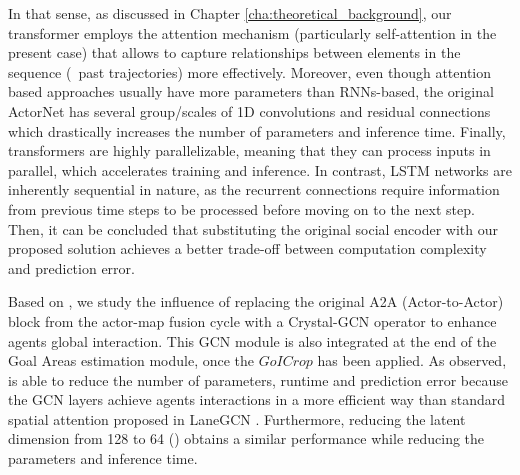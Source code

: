In that sense, as discussed in Chapter \ref{cha:theoretical_background}, our transformer employs the attention mechanism (particularly self-attention in the present case) that allows to capture relationships between elements in the sequence (\ie \ past trajectories) more effectively. Moreover, even though attention based approaches usually have more parameters than \acp{RNN}-based, the original ActorNet has several group/scales of 1D convolutions and residual connections which drastically increases the number of parameters and inference time. Finally, transformers are highly parallelizable, meaning that they can process inputs in parallel, which accelerates training and inference. In contrast, \ac{LSTM} networks are inherently sequential in nature, as the recurrent connections require information from previous time steps to be processed before moving on to the next step. Then, it can be concluded that substituting the original social encoder with our proposed solution achieves a better trade-off between computation complexity and prediction error. 

Based on , we study the influence of replacing the original A2A (Actor-to-Actor) block from the actor-map fusion cycle \cite{liang2020learning} with a Crystal-\ac{GCN} \cite{schmidt2022crat} operator to enhance agents global interaction. This \ac{GCN} module is also integrated at the end of the Goal Areas estimation module, once the $GoICrop$ has been applied. As observed,  is able to reduce the number of parameters, runtime and prediction error because the \ac{GCN} layers achieve agents interactions in a more efficient way than standard spatial attention proposed in LaneGCN \cite{liang2020learning}. Furthermore, reducing the latent dimension from 128 to 64 () obtains a similar performance while reducing the parameters and inference time.

